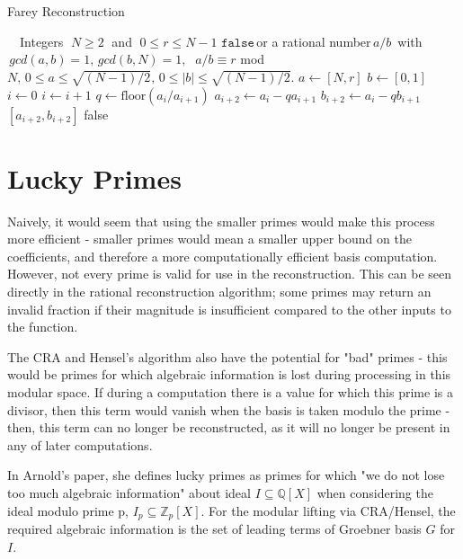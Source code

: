 \documentclass[letterpaper,12pt,titlepage,oneside,final]{book}
\newcommand\abs[1]{\left|#1\right|}
\begin{document}
\begin{algorithm}[H]
\caption{Farey Reconstruction}\label{farey}
\begin{algorithmic}[1]
\Input $\quad$Integers $\; N \geq 2 \;$ and $\; 0 \leq r \leq N - 1$
\Output $\texttt{false} \,$or a rational number$\, a/b \,$ with$\, gcd(a, b) = 1,\, gcd(b, N) = 1,$ $\; a/b \equiv r $ mod $ N, \, 0 \leq a \leq \sqrt{(N-1)/2}, \, 0 \leq \abs{b} \leq \sqrt{(N-1)/2}.$ 
\State $a \gets [ N, r]$
\State $b \gets [ 0, 1]$
\State $i \gets 0$
  \State $i \gets i + 1$
  \State $q \gets \text{floor}( a_i / a_{i+1})$
  \State $a_{i+2} \gets a_i - qa_{i+1}$
  \State $b_{i+2} \gets a_i - qb_{i+1}$
\EndWhile\\  
  \State \quad \Return $[ a_{i+2}, b_{i+2}]$
\Else 
  \State \quad \Return false
\EndIf
\EndProcedure
\end{algorithmic}
\end{algorithm}

\section{Lucky Primes}

Naively, it would seem that using the smaller primes would make this process more efficient - smaller primes would mean a smaller upper bound on the coefficients, and therefore a more computationally efficient basis computation.  However, not every prime is valid for use in the reconstruction.  This can be seen directly in the rational reconstruction algorithm; some primes may return an invalid fraction if their magnitude is insufficient compared to the other inputs to the function.  

The CRA and Hensel's algorithm also have the potential for "bad" primes - this would be primes for which algebraic information is lost during processing in this modular space.  If during a computation there is a value for which this prime is a divisor, then this term would vanish when the basis is taken modulo the prime - then, this term can no longer be reconstructed, as it will no longer be present in any of later computations.

In Arnold's paper, she defines lucky primes as primes for which "we do not lose too much algebraic information" about ideal ${I \subseteq \mathbb{Q}[X]}$ when considering the ideal modulo prime p, ${I_p \subseteq \mathbb{Z}_p[X]}$.  For the modular lifting via CRA/Hensel, the required algebraic information is the set of leading terms of Groebner basis ${G}$ for ${I}$.
\end{document}
